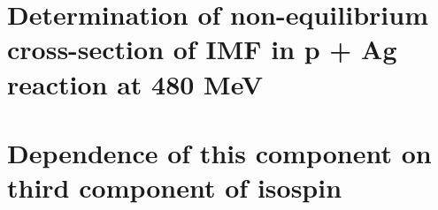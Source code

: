 \section{Determination of non-equilibrium cross-section of IMF in p + Ag reaction at 480 MeV}
\section{Dependence of this component on third component of isospin}